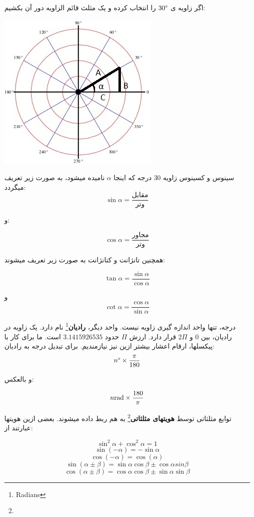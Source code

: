 \documentclass[14pt,a4paper]{memoir}
\begin{document}
اگر زاویه ی $   30\degree   $ را انتخاب کرده و یک مثلث قائم الزاویه دور آن بکشیم:


	   \begin{center}
	 	\includegraphics[scale=1]{ThirtyDegrees}
	 \end{center}
	 
	 سینوس و کسینوس زاویه 30 درجه که اینجا $ \alpha $ نامیده میشود، به صورت زیر تعریف میگردد:
	 \[ \sin \alpha = \frac{\text{مقابل}}{\text{وتر}} \]
	 
	 و:
	 
	 \[ \cos \alpha = \frac{\text{مجاور}}{\text{وتر}} \]
	 
	 همچنین تانژانت و کتانژانت به صورت زیر تعریف میشوند:
	 
	  \[ \tan \alpha = \frac{\sin \alpha}{\cos \alpha} \]
	  
	  
	  و 
	  \[ \cot \alpha = \frac{\cos \alpha}{\sin \alpha} \]
	  
	  
	  درجه، تنها واحد اندازه گیری زاویه نیست. واحد دیگر، \textbf{رادیان}\footnote{Radians} نام دارد. یک زاویه در رادیان، بین $ 0 $ و $   2\Pi $ قرار دارد. ارزش $ \Pi $ حدود $ 3.1415926535 $ است. ما برای کار با پیکسلها، ارقام اعشار بیشتر ازین نیز نیازمندیم. برای تبدیل درجه به رادیان:
	  \[ n\degree \times 	  \frac{\pi}{180} \]
	  
	  و بالعکس:
	  
	  \[ n \space \textrm{rad} \times 	  \frac{180}{\pi} \]
	  
	  
	  
	  
	  توابع مثلثاتی توسط \textbf{هویتهای مثلثاتی}\footnote{} به هم ربط داده میشوند. بعضی ازین هویتها عبارتند از:
	  
	  \[ \sin^2 \alpha + \cos^2 \alpha = 1 \]
	  \[ \sin(-\alpha) = -\sin\alpha \]
	  \[ \cos(-\alpha) = \cos(\alpha) \]
	  \[ \sin(\alpha\pm\beta) = \sin\alpha\cos\beta \pm\cos\alpha sin\beta \]
	  \[ \cos(\alpha\pm\beta) = \cos\alpha\cos\beta\pm\sin\alpha\sin\beta \]
	 
\end{document}

